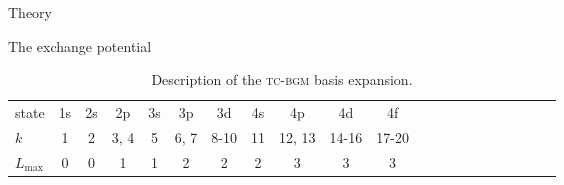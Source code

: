 \documentclass[aps, pra, reprint, groupedaddress, amsfonts, longbibliography,
               amsmath, amssymb, showpacs, nofootinbib]{revtex4-1}
\begin{document}
\begin{section}{Theory \label{sec:theory}}
\begin{subsection}{The exchange potential \label{sec:xpot}}
      \begin{table}
         \caption{Description of the \textsc{tc-bgm} basis expansion. \label{tab:basis}}
         \begin{ruledtabular}
            \begin{tabular}{lcccccccccccccccccccc}
               state            & 1s & 2s & 2p & 3s & 3p & 3d & 4s & 4p & 4d & 4f \\
               $k$              & 1 & 2 & 3, 4 &5 & 6, 7 & 8{-}10 & 11 & 12, 13 & 14{-}16 & 17{-}20 \\
               $L_\mathrm{max}$ & 0  & 0  & 1  & 1  & 2  & 2  & 2  & 3  & 3  & 3
            \end{tabular}
         \end{ruledtabular}
      \end{table}


\end{subsection}
\end{section}
\end{document}
